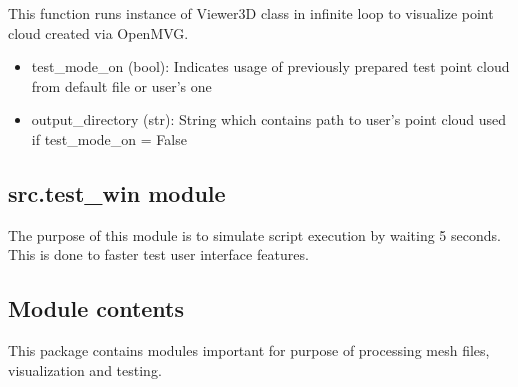 \documentclass[letterpaper,10pt,english]{sphinxmanual}
\begin{document}
\begin{fulllineitems}
\label{\detokenize{src:src.point_cloud_visualizer.run_cloud_gui}}
\pysigstartsignatures
{}
\pysigstopsignatures
\sphinxAtStartPar
This function runs instance of Viewer3D class in infinite loop to visualize point cloud created via OpenMVG.
\begin{description}
\begin{itemize}
\item {} 
\sphinxAtStartPar
test\_mode\_on    (bool): Indicates usage of previously prepared test point cloud from default file or user’s one

\item {} 
\sphinxAtStartPar
output\_directory (str): String which contains path to user’s point cloud used if test\_mode\_on = False

\end{itemize}

\end{description}

\end{fulllineitems}



\subsection{src.test\_win module}
\label{\detokenize{src:module-src.test_win}}\label{\detokenize{src:src-test-win-module}}
\sphinxAtStartPar
The purpose of this module is to simulate script execution by waiting 5 seconds. This is done to faster test user
interface features.


\subsection{Module contents}
\label{\detokenize{src:module-src}}\label{\detokenize{src:module-contents}}
\sphinxAtStartPar
This package contains modules important for purpose of processing mesh files, visualization and testing.
\end{document}
